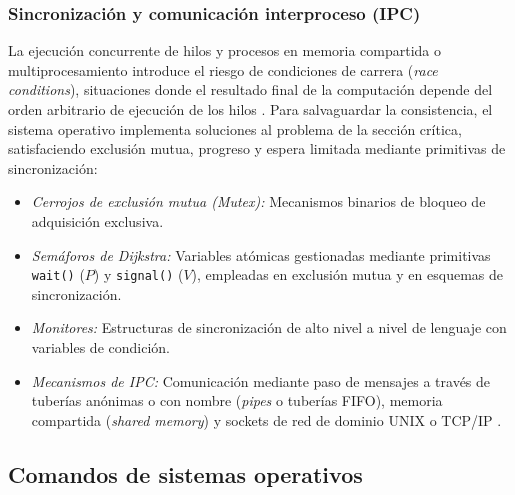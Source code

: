 \documentclass[12pt]{article}
\begin{document}
\subsubsection{Sincronización y comunicación interproceso (IPC)}
La ejecución concurrente de hilos y procesos en memoria compartida o multiprocesamiento introduce el riesgo de condiciones de carrera (\textit{race conditions}), situaciones donde el resultado final de la computación depende del orden arbitrario de ejecución de los hilos \parencite[\S 6.1, pp.\ 191--194]{silberschatz2006fundamentos}. Para salvaguardar la consistencia, el sistema operativo implementa soluciones al problema de la sección crítica, satisfaciendo exclusión mutua, progreso y espera limitada mediante primitivas de sincronización:
\begin{itemize}[noitemsep, topsep=1pt]
    \item \textit{Cerrojos de exclusión mutua (\textit{Mutex}):} Mecanismos binarios de bloqueo de adquisición exclusiva.
    \item \textit{Semáforos de Dijkstra:} Variables atómicas gestionadas mediante primitivas \texttt{wait()} ($P$) y \texttt{signal()} ($V$), empleadas en exclusión mutua y en esquemas de sincronización.
    \item \textit{Monitores:} Estructuras de sincronización de alto nivel a nivel de lenguaje con variables de condición.
    \item \textit{Mecanismos de IPC:} Comunicación mediante paso de mensajes a través de tuberías anónimas o con nombre (\textit{pipes} o tuberías FIFO), memoria compartida (\textit{shared memory}) y sockets de red de dominio UNIX o TCP/IP \parencite[\S 3.5, pp.\ 98--108]{silberschatz2006fundamentos}.
\end{itemize}

\subsection{Comandos de sistemas operativos}\label{sec:comandosSistemasOperativos}
\end{document}
